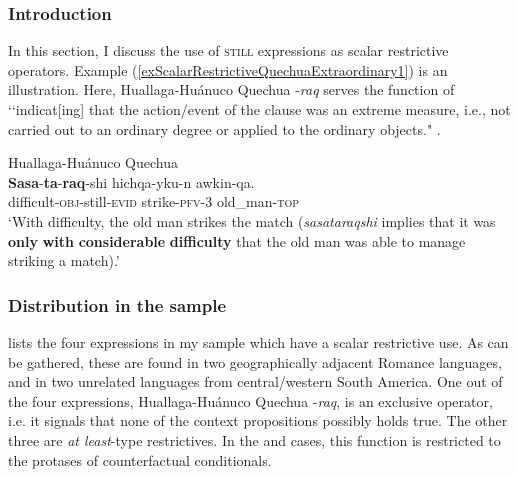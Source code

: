 \subsubsection{Introduction}
In this section, I discuss the use of \textsc{still} expressions as scalar restrictive operators. Example (\ref{exScalarRestrictiveQuechuaExtraordinary1}) is an illustration. Here, Huallaga-Huánuco Quechua \mbox{-\textit{raq}} serves the function of \lq\lq indicat[ing] that the action/event of the clause was an extreme measure, i.e., not carried out to an ordinary degree or applied to the ordinary ob­jects." \parencite[389]{Weber1989}.

\begin{exe}
	\ex Huallaga-Huánuco Quechua \label{exScalarRestrictiveQuechuaExtraordinary1}\\
		\gll \textbf{Sasa}-\textbf{ta}-\textbf{raq}-shi hichqa-yku-n awkin-qa.\\
	difficult-\textsc{obj}-still-\textsc{evid} strike-\textsc{pfv}-3 old\_man-\textsc{top}\\
	\glt \lq With difficulty, the old man strikes the match (\textit{sasataraqshi} implies that it was \textbf{only} \textbf{with} \textbf{considerable} \textbf{difficulty} that the old man was able to manage striking a match).' \parencite[389]{Weber1989}
\end{exe}

\subsubsection{Distribution in the sample}

 lists the four expressions in my sample which have a scalar restrictive use. As can be gathered, these are found in two geographically adjacent Romance languages, and in two unrelated languages from central/western South America. One out of the four expressions, Huallaga-Huánuco Quechua \mbox{-\textit{raq}}, is an exclusive operator, i.e. it signals that none of the context propositions possibly holds true. The other three are \textit{at least}-type restrictives. In the  and  cases, this function is restricted to the protases of counterfactual conditionals.

